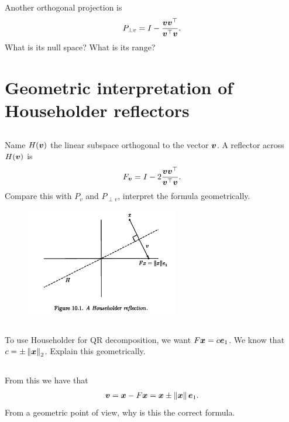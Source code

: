 \documentclass[11pt,letterpaper]{article}
\begin{document}
\subsection{}
Another orthogonal projection is
\begin{align*}
    P_{\perp v} = I-\frac{\boldsymbol{v} \boldsymbol{v}^\top}{\boldsymbol{v}^\top \boldsymbol{v}}.
\end{align*}
What is its null space? What is its range?

\newpage
\section{Geometric interpretation of Householder reflectors}
\subsection{}
Name $H(\boldsymbol{v})$ the linear subspace orthogonal to the vector $\boldsymbol{v}$. A reflector across $H(\boldsymbol{v})$ is 
\begin{align*}
    F_{\boldsymbol{v}} = I - 2 \frac{\boldsymbol{v} \boldsymbol{v}^\top}{\boldsymbol{v}^\top \boldsymbol{v}}.
\end{align*}
Compare this with $P_v$ and $P_{\perp v}$, interpret the formula geometrically.

\begin{figure}[H]
    \centering
    \includegraphics[width = 0.6\textwidth]{figs/TB_HouseholderRef}
\end{figure}

\subsection{}
To use Householder for QR decomposition, we want $F\boldsymbol{x} = c\boldsymbol{e}_1$. We know that $c = \pm\left\Vert \boldsymbol{x} \right\Vert_2$. Explain this geometrically.

\subsection{}
From this we have that
\begin{align*}
    \boldsymbol{v} = \boldsymbol{x}- F\boldsymbol{x} =  \boldsymbol{x} \pm \left\Vert \boldsymbol{x} \right\Vert\boldsymbol{e}_1.
\end{align*}
From a geometric point of view, why is this the correct formula.





\vfill


\end{document}
